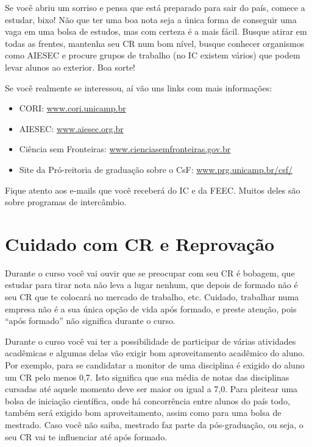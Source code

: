 Se você abriu um sorriso e pensa que está preparado para sair do país,
comece a estudar, bixo! Não que ter uma boa nota seja a única forma de
conseguir uma vaga em uma bolsa de estudos, mas com certeza é a mais fácil.
Busque atirar em todas as frentes, mantenha seu CR num bom nível, busque
conhecer organismos como AIESEC e procure grupos de trabalho (no IC existem
vários) que podem levar alunos ao exterior. Boa sorte!

Se você realmente se interessou, aí vão uns links com mais informações:

\begin{itemize}
\item  CORI: \url{www.cori.unicamp.br}
\item  AIESEC: \url{www.aiesec.org.br}
\item  Ciência sem Fronteiras: \url{www.cienciasemfronteiras.gov.br}
\item  Site da Pró-reitoria de graduação sobre o CsF: \url{www.prg.unicamp.br/csf/}
\end{itemize}

Fique atento aos e-mails que você receberá do IC e da FEEC. Muitos deles são sobre programas de intercâmbio.

\section{Cuidado com CR e Reprovação}

Durante o curso você vai ouvir que se preocupar com seu CR é bobagem, que
estudar para tirar nota não leva a lugar nenhum, que depois de formado não é seu
CR que te colocará no mercado de trabalho, etc. Cuidado, trabalhar numa empresa não
é a sua única opção de vida após formado, e preste atenção, pois ``após formado''
não significa durante o curso.

Durante o curso você vai ter a possibilidade de participar de várias atividades
acadêmicas e algumas delas vão exigir bom aproveitamento acadêmico do aluno. Por
exemplo, para se candidatar a monitor de uma disciplina é exigido do aluno um CR
pelo menos 0,7. Isto significa que sua média de notas das disciplinas cursadas até
aquele momento deve ser maior ou igual a 7,0. Para pleitear uma bolsa de
iniciação científica, onde há concorrência entre alunos do país todo, também
será exigido bom aproveitamento, assim como para uma bolsa de mestrado. Caso
você não saiba, mestrado faz parte da pós-graduação, ou seja, o seu CR vai te
influenciar até após formado.


